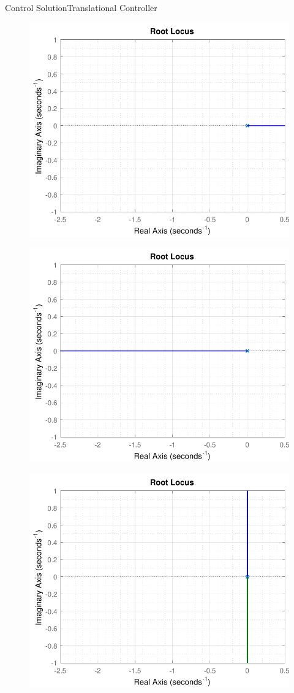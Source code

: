 \begin{frame}{Control Solution}{Translational Controller}
    {
      \begin{figure}[H]
        \hspace*{-.8cm}
        \includegraphics[width=.7\textwidth]{figures/rootLocusZ1}
      \end{figure}
    }
    {
      \begin{figure}[H]
        \hspace*{-.8cm}
        \includegraphics[width=.7\textwidth]{figures/rootLocusZ2}
      \end{figure}
    }
    {
      \begin{figure}[H]
        \hspace*{-.8cm}
        \includegraphics[width=.7\textwidth]{figures/rootLocusZ3}

\end{figure}}
\end{frame}
